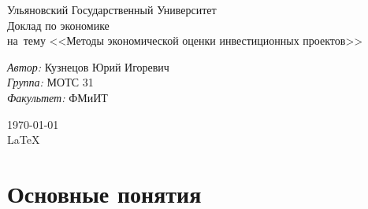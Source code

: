 \documentclass[a4paper,12pt]{article}
\begin{document}
\begin{titlepage}
\begin{center} 
\large Ульяновский Государственный Университет\\[4.5cm] 

\huge Доклад по экономике\\[0.6cm] 
\large на~тему <<Методы экономической оценки инвестиционных проектов>>\\[3.7cm]

\begin{minipage}{0.5\textwidth} 
\begin{flushleft} 
\emph{Автор:} Кузнецов Юрий Игоревич\\
\emph{Группа:} МОТС 31\\
\emph{Факультет:} ФМиИТ\\
\end{flushleft}
\end{minipage} 
\vfill 
{\large \today} 
{\large  \\ \LaTeX} 
\end{center} 
\thispagestyle{empty}
\end{titlepage} 

\newpage
\tableofcontents

\newpage
	\section{Основные понятия}
\end{document}
